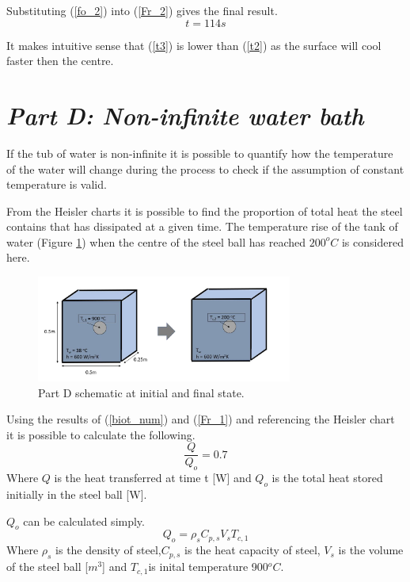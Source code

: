 \documentclass[11pt]{article}
\begin{document}
Substituting (\ref{fo_2}) into (\ref{Fr_2}) gives the final result.
\begin{equation}\label{t3}
	t = 114s
\end{equation}

It makes intuitive sense that (\ref{t3}) is lower than (\ref{t2}) as the surface will cool faster then the centre.

\section{\emph{Part D: Non-infinite water bath}}
If the tub of water is non-infinite it is possible to quantify how the temperature of the water will change during the process to check if the assumption of constant temperature is valid. 

From the Heisler charts it is possible to find the proportion of total heat the steel contains that has dissipated at a given time. The temperature rise of the tank of water (Figure \ref{fig:schem_d}) when the centre of the steel ball has reached $200^{o}C$ is considered here.
\begin{figure}[!htbp]
	\centering
	\includegraphics[width=0.75\textwidth]{part_d_fig}
	\caption{Part D schematic at initial and final state.}
	\label{fig:schem_d}
\end{figure}

Using the results of (\ref{biot_num}) and (\ref{Fr_1}) and referencing the Heisler chart \cite{bergman_fundamentals_2011} it is possible to calculate the following.
\begin{equation}\label{q_ratio}
	\frac{Q}{Q_o} = 0.7
\end{equation}
Where $Q$ is the heat transferred at time t [W] and $Q_o$ is the total heat stored initially in the steel ball [W].

$Q_o$ can be calculated simply.
\begin{equation}\label{q_o}
	Q_o = \rho_s C_{p,s} V_s T_{c,1}
\end{equation}
Where $\rho_s$ is the density of steel,$C_{p,s}$ is the heat capacity of steel, $V_s$ is the volume of the steel ball [$m^3$] and $T_{c,1} $is inital temperature 900$^oC$.
\end{document}
